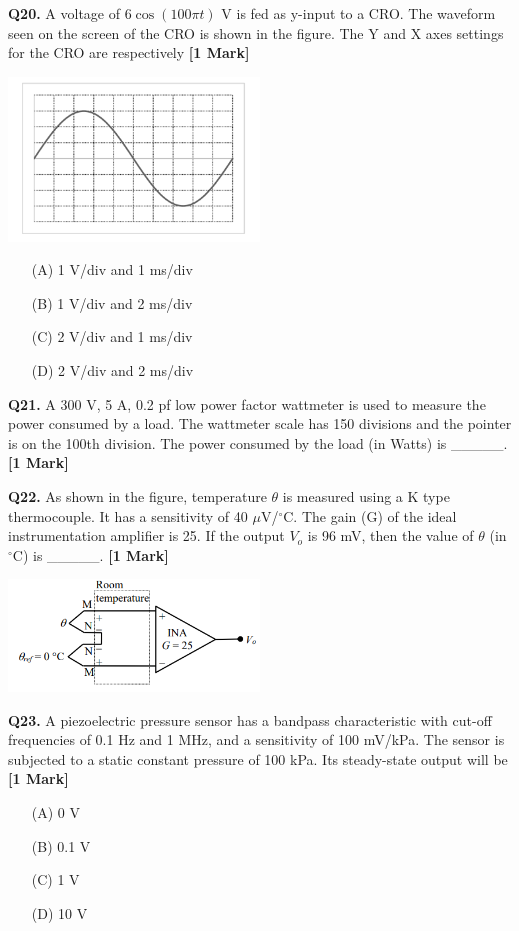 \documentclass[11pt]{article}
\newcommand{\questiona}[2]{
    \noindent\textbf{Q#2.} #1 \hfill \textbf{[1 Mark]}
}
\begin{document}
\questiona{A voltage of \(6\cos(100\pi t)\) V is fed as y-input to a CRO. The waveform seen on the screen of the CRO is shown in the figure. The Y and X axes settings for the CRO are respectively}{20}
\begin{center}
\includegraphics[width=0.5\textwidth]{figures/20.png}
\end{center}
\begin{enumerate}
    \item[(A)] 1 V/div and 1 ms/div
    \item[(B)] 1 V/div and 2 ms/div
    \item[(C)] 2 V/div and 1 ms/div
    \item[(D)] 2 V/div and 2 ms/div
\end{enumerate}
\vspace{0.5cm}

\questiona{A 300 V, 5 A, 0.2 pf low power factor wattmeter is used to measure the power consumed by a load. The wattmeter scale has 150 divisions and the pointer is on the 100th division. The power consumed by the load (in Watts) is \_\_\_\_\_.}{21}
\vspace{0.5cm}

\questiona{As shown in the figure, temperature \(\theta\) is measured using a K type thermocouple. It has a sensitivity of 40 \(\mu\)V/\(^\circ\)C. The gain (G) of the ideal instrumentation amplifier is 25. If the output \(V_o\) is 96 mV, then the value of \(\theta\) (in \(^\circ\)C) is \_\_\_\_\_.}{22}
\begin{center}
\includegraphics[width=0.5\textwidth]{figures/22.png}
\end{center}
\vspace{0.5cm}

\questiona{A piezoelectric pressure sensor has a bandpass characteristic with cut-off frequencies of 0.1 Hz and 1 MHz, and a sensitivity of 100 mV/kPa. The sensor is subjected to a static constant pressure of 100 kPa. Its steady-state output will be}{23}
\begin{enumerate}
    \item[(A)] 0 V
    \item[(B)] 0.1 V
    \item[(C)] 1 V
    \item[(D)] 10 V
\end{enumerate}
\vspace{0.5cm}
\end{document}
